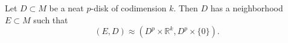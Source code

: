 Let $D \subset M$ be a neat $p$-disk of codimension $k$. Then $D$ has a neighborhood $E \subset M$ such that
$$(E, D) \approx (D^p \times \mathbb{R}^k, D^p \times \{0\}).$$

